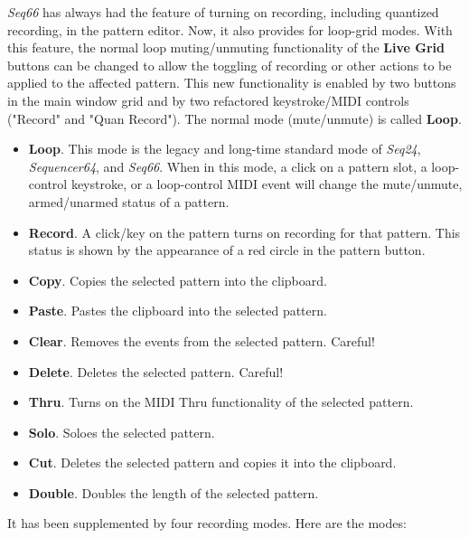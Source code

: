    \textsl{Seq66} has always had the feature of turning on recording,
   including quantized recording, in the pattern editor.
   Now, it also provides for
   loop-grid modes.
   With this feature, the normal loop muting/unmuting
   functionality of the \textbf{Live Grid} buttons
   can be changed to allow the toggling
   of recording or other actions to be applied to the affected  pattern.
   This new functionality is enabled by two buttons in the main window grid and
   by two refactored keystroke/MIDI controls ("Record" and "Quan Record").
   The normal mode (mute/unmute) is called \textbf{Loop}.

   \begin{itemize}
      \item \textbf{Loop}.
         This mode is the legacy and long-time standard mode of
         \textsl{Seq24}, \textsl{Sequencer64}, and \textsl{Seq66}.
         When in this mode, a click on a pattern slot, a loop-control
         keystroke, or a loop-control MIDI event will change the mute/unmute,
         armed/unarmed status of a pattern.
      \item \textbf{Record}.
         A click/key on the pattern turns on recording for that pattern.
         This status is shown by the appearance of a red circle in the pattern
         button.
      \item \textbf{Copy}.
         Copies the selected pattern into the clipboard.
      \item \textbf{Paste}.
         Pastes the clipboard into the selected pattern.
      \item \textbf{Clear}.
         Removes the events from the selected pattern.  Careful!
      \item \textbf{Delete}.
         Deletes the selected pattern.  Careful!
      \item \textbf{Thru}.
         Turns on the MIDI Thru functionality of the selected pattern.
      \item \textbf{Solo}.
         Soloes the selected pattern.
      \item \textbf{Cut}.
         Deletes the selected pattern and copies it into the clipboard.
      \item \textbf{Double}.
         Doubles the length of the selected pattern.
   \end{itemize}
   It has been supplemented by four recording modes.
   Here are the modes:

